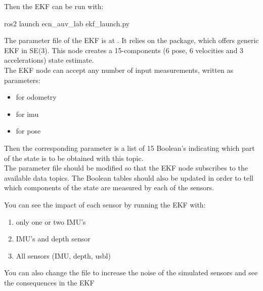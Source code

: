 \documentclass{ecnreport}
\begin{document}
Then the EKF can be run with:
 \begin{bashcodelarge}
ros2 launch ecn_auv_lab ekf_launch.py
 \end{bashcodelarge}

The parameter file of the EKF is at . It relies on the  package, which offers generic EKF in SE(3). This node creates a 15-components (6 pose, 6 velocities and 3 accelerations) state estimate.\\

The EKF node can accept any number of input measurements, written as parameters:
\begin{itemize}
 \item {} for odometry
 \item {}  for imu
 \item {} for pose
\end{itemize}
Then the corresponding  parameter is a list of 15 Boolean's indicating which part of the state is to be obtained with this topic. \\

The parameter file should be modified so that the EKF node
subscribes to the available data topics. The Boolean tables should
also be updated in order to tell which components of the state are measured by each of the sensors.

You can see the impact of each sensor by running the EKF with:
\begin{enumerate}
 \item only one or two IMU's
 \item IMU's and depth sensor
 \item All sensors (IMU, depth, usbl)
\end{enumerate}

You can also change the  file to increase the noise of the simulated sensors and see the consequences in the EKF
\end{document}
